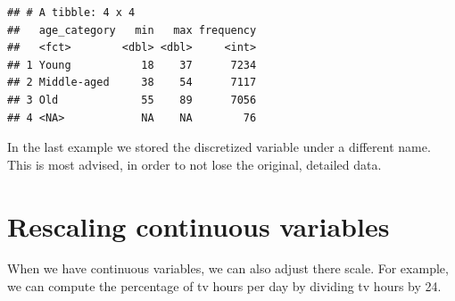 \documentclass[]{tufte-book}
\newenvironment{Shaded}{}{}
\newcommand{\KeywordTok}[1]{\textcolor[rgb]{0.00,0.44,0.13}{\textbf{#1}}}
\newcommand{\DataTypeTok}[1]{\textcolor[rgb]{0.56,0.13,0.00}{#1}}
\newcommand{\DecValTok}[1]{\textcolor[rgb]{0.25,0.63,0.44}{#1}}
\newcommand{\StringTok}[1]{\textcolor[rgb]{0.25,0.44,0.63}{#1}}
\newcommand{\OperatorTok}[1]{\textcolor[rgb]{0.40,0.40,0.40}{#1}}
\newcommand{\NormalTok}[1]{#1}
\begin{document}
\begin{verbatim}
## # A tibble: 4 x 4
##   age_category   min   max frequency
##   <fct>        <dbl> <dbl>     <int>
## 1 Young           18    37      7234
## 2 Middle-aged     38    54      7117
## 3 Old             55    89      7056
## 4 <NA>            NA    NA        76
\end{verbatim}

In the last example we stored the discretized variable under a different
name. This is most advised, in order to not lose the original, detailed
data.

\section{Rescaling continuous
variables}\label{rescaling-continuous-variables}

When we have continuous variables, we can also adjust there scale. For
example, we can compute the percentage of tv hours per day by dividing
tv hours by 24.

\begin{Shaded}
\end{Shaded}
\end{document}
